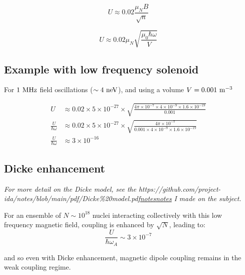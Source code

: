 \documentclass[
]{article}
\let\oldhref\href
\renewcommand{\href}[2]{\ifx#1\urlprefix\oldhref{#1}{#2}\else\uline{\oldhref{#1}{#2}}\fi}
\renewcommand{\[}{\begin{equation}}
\renewcommand{\]}{\end{equation}}
\begin{document}
\[
U \approx 0.02 \frac{{\mu_N}B}{\sqrt{n}}
\]

\[
U \approx 0.02 {\mu_N}\sqrt{\frac{\mu_0\hbar\omega}{V}}
\]

\subsection{Example with low frequency
solenoid}\label{example-with-low-frequency-solenoid}

For \(1 \ \rm MHz\) field oscillations (\(\sim 4 \ \rm neV\)), and using
a volume \(V = 0.001 \ \rm m^{-3}\)

\[
\begin{aligned}
U &\approx 0.02 \times 5\times 10^{-27}\times \sqrt{\frac{4\pi\times 10^{-7}\times 4\times 10^{-9}\times 1.6\times 10^{-19}}{0.001}} \\
\frac{U}{\hbar\omega} &\approx 0.02 \times 5\times 10^{-27}\times\sqrt{\frac{4\pi\times 10^{-7} }{0.001 \times 4\times 10^{-9}\times 1.6\times 10^{-19}}} \\
\frac{U}{\hbar\omega} &\approx 3\times10^{-16}
\end{aligned}
\]

\subsection{Dicke enhancement}\label{dicke-enhancement-2}

\emph{For more detail on the Dicke model, see the
\href{https://github.com/project-ida/notes/blob/main/pdf/Dicke\%20model.pdf}{notes}
I made on the subject.}

For an ensemble of \(N\sim 10^{18}\) nuclei interacting collectively
with this low frequency magnetic field, coupling is enhanced by
\(\sqrt{N}\), leading to: \[
\frac{U}{\hbar \omega_A} \sim 3 \times 10^{-7}
\]

and so even with Dicke enhancement, magnetic dipole coupling remains in
the weak coupling regime.

\printbibliography
\end{document}
